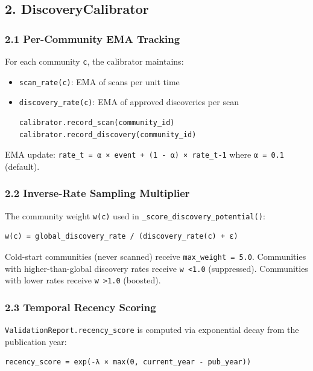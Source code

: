 \subsection{2. DiscoveryCalibrator}

\subsubsection{2.1 Per-Community EMA Tracking}

For each community \texttt{c}, the calibrator maintains:
\begin{itemize}
\item \texttt{scan\_rate(c)}: EMA of scans per unit time
\item \texttt{discovery\_rate(c)}: EMA of approved discoveries per scan

\begin{lstlisting}
calibrator.record_scan(community_id)
calibrator.record_discovery(community_id)
\end{lstlisting}

\end{itemize}
EMA update: \texttt{rate\_t = α × event + (1 - α) × rate\_{t-1}} where \texttt{α = 0.1} (default).

\subsubsection{2.2 Inverse-Rate Sampling Multiplier}

The community weight \texttt{w(c)} used in \texttt{\_score\_discovery\_potential()}:

\begin{lstlisting}
w(c) = global_discovery_rate / (discovery_rate(c) + ε)
\end{lstlisting}

Cold-start communities (never scanned) receive \texttt{max\_weight = 5.0}. Communities with higher-than-global discovery rates receive \texttt{w \textless  1.0} (suppressed). Communities with lower rates receive \texttt{w \textgreater  1.0} (boosted).

\subsubsection{2.3 Temporal Recency Scoring}

\texttt{ValidationReport.recency\_score} is computed via exponential decay from the publication year:

\begin{lstlisting}
recency_score = exp(-λ × max(0, current_year - pub_year))
\end{lstlisting}

